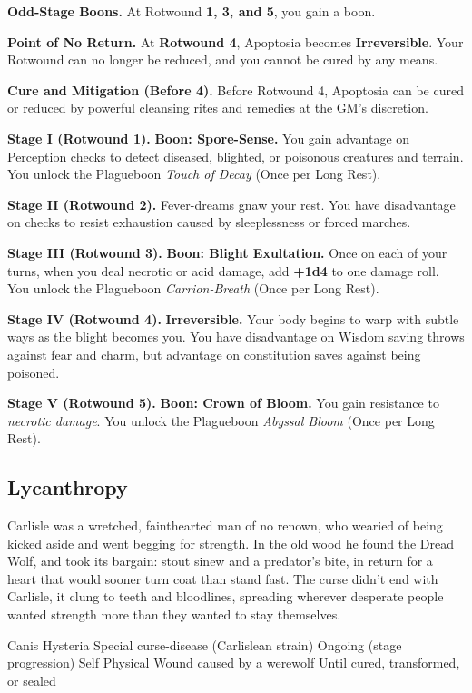 \documentclass[letterpaper,twocolumn,openany,nodeprecatedcode,breakable,skins,xparse,most]{dndbook}
\begin{document}
\textbf{Odd-Stage Boons.} At Rotwound \textbf{1, 3, and 5}, you gain a boon.

\textbf{Point of No Return.} At \textbf{Rotwound 4}, Apoptosia becomes \textbf{Irreversible}. Your Rotwound can no longer be reduced, and you cannot be cured by any means.

\textbf{Cure and Mitigation (Before 4).} Before Rotwound 4, Apoptosia can be cured or reduced by powerful cleansing rites and remedies at the GM's discretion.

\medskip

\textbf{Stage I (Rotwound 1).} \textbf{Boon: Spore-Sense.} You gain advantage on Perception checks to detect diseased, blighted, or poisonous creatures and terrain.
You unlock the Plagueboon \emph{Touch of Decay} (Once per Long Rest).

\textbf{Stage II (Rotwound 2).} Fever-dreams gnaw your rest. You have disadvantage on checks to resist exhaustion caused by sleeplessness or forced marches.

\textbf{Stage III (Rotwound 3).} \textbf{Boon: Blight Exultation.} Once on each of your turns, when you deal necrotic or acid damage, add \textbf{+1d4} to one damage roll.
You unlock the Plagueboon \emph{Carrion-Breath} (Once per Long Rest).

\textbf{Stage IV (Rotwound 4).} \textbf{Irreversible.} Your body begins to warp with subtle ways as the blight becomes you. You have disadvantage on Wisdom saving throws against fear and charm, but advantage on constitution saves against being poisoned.

\textbf{Stage V (Rotwound 5).} \textbf{Boon: Crown of Bloom.} You gain resistance to \textit{necrotic damage}.
You unlock the Plagueboon \emph{Abyssal Bloom} (Once per Long Rest).

\subsection{Lycanthropy}

Carlisle was a wretched, fainthearted man of no renown, who wearied of being kicked aside and went begging for strength. In the old wood he found the Dread Wolf, and took its bargain: stout sinew and a predator’s bite, in return for a heart that would sooner turn coat than stand fast. The curse didn’t end with Carlisle, it clung to teeth and bloodlines, spreading wherever desperate people wanted strength more than they wanted to stay themselves.

\DndSpellHeader%
  {Canis Hysteria}
  {Special curse-disease (Carlislean strain)}
  {Ongoing (stage progression)}
  {Self}
  {Physical Wound caused by a werewolf}
  {Until cured, transformed, or sealed}
\end{document}
